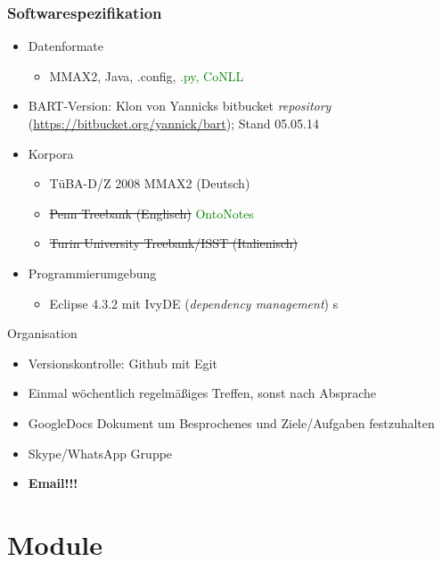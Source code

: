 \documentclass[11pt,a4paper]{beamer}
\begin{document}
\begin{frame}
\frametitle{Softwarespezifikation}

\begin{itemize}

	\item Datenformate
		\begin{itemize}
		\item MMAX2, Java, .config, \textcolor{green}{.py, CoNLL}
	\end{itemize}
	\item BART-Version: Klon von Yannicks bitbucket \textit{repository} (\url{https://bitbucket.org/yannick/bart}); Stand 05.05.14 
	\item Korpora
	\begin{itemize}
		\item TüBA-D/Z 2008 MMAX2 (Deutsch)
		\item \sout{Penn Treebank (Englisch)} \textcolor{green}{OntoNotes}
		\item \sout{Turin University Treebank/ISST (Italienisch)}
	\end{itemize}
	\item Programmierumgebung
	\begin{itemize}
		\item Eclipse 4.3.2 mit IvyDE (\textit{dependency management}) s
	\end{itemize}

\end{itemize}
\end{frame}

\begin{frame}{Organisation} 
	\begin{itemize}
	\item Versionskontrolle: Github mit Egit
	\item Einmal wöchentlich regelmäßiges Treffen, sonst nach Absprache
	\item GoogleDocs Dokument um Besprochenes und Ziele/Aufgaben festzuhalten
	\item Skype/WhatsApp Gruppe
	\item \textbf{Email!!!}
	
	\end{itemize}
\end{frame}
\section{Module}
\end{document}
